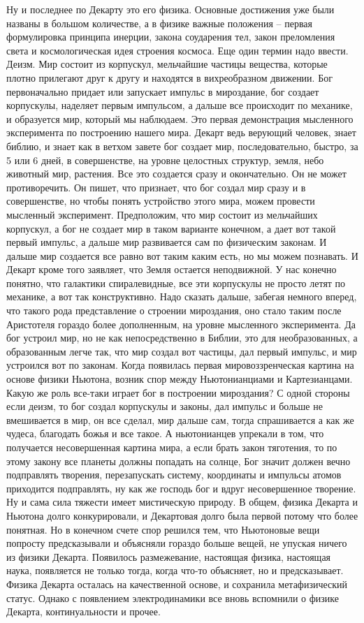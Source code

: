 \documentclass[a4paper, 12pt]{article}
\begin{document}
Ну и последнее по Декарту это его физика. Основные достижения уже были 
названы в большом количестве, а в физике важные положения -- первая 
формулировка принципа инерции, закона соударения тел, закон преломления 
света и космологическая идея строения космоса. Еще один термин надо 
ввести. Деизм. Мир состоит из корпускул, мельчайшие частицы вещества, 
которые плотно прилегают друг к другу и находятся в вихреобразном 
движении. Бог первоначально придает или запускает импульс в мироздание, 
бог создает корпускулы, наделяет первым импульсом, а дальше все 
происходит по механике, и образуется мир, который мы наблюдаем. Это 
первая демонстрация мысленного эксперимента по построению нашего мира. 
Декарт ведь верующий человек, знает библию, и знает как в ветхом завете 
бог создает мир, последовательно, быстро, за 5 или 6 дней, 
в совершенстве, на уровне целостных структур, земля, небо животный мир, 
растения. Все это создается сразу и окончательно. Он не может 
противоречить. Он пишет, что признает, что бог создал мир сразу 
и в совершенстве, но чтобы понять устройство этого мира, можем провести 
мысленный эксперимент. Предположим, что мир состоит из мельчайших 
корпускул, а бог не создает мир в таком варианте конечном, а дает вот 
такой первый импульс, а дальше мир развивается сам по физическим 
законам. И дальше мир создается все равно вот таким каким есть, но мы 
можем познавать. И Декарт кроме того заявляет, что Земля остается 
неподвижной. У нас конечно понятно, что галактики спиралевидные, все эти 
корпускулы не просто летят по механике, а вот так конструктивно. Надо 
сказать дальше, забегая немного вперед, что такого рода представление 
о строении мироздания, оно стало таким после Аристотеля гораздо более 
дополненным, на уровне мысленного эксперимента. Да бог устроил мир, но 
не как непосредственно в Библии, это для необразованных, а образованным 
легче так, что мир создал вот частицы, дал первый импульс, и мир 
устроился вот по законам. Когда появилась первая мировоззренческая 
картина на основе физики Ньютона, возник спор между Ньютонианциами 
и Картезианцами. Какую же роль все-таки играет бог в построении 
мироздания? С одной стороны если деизм, то бог создал корпускулы 
и законы, дал импульс и больше не вмешивается в мир, он все сделал, мир 
дальше сам, тогда спрашивается а как же чудеса, благодать божья и все 
такое. А ньютонианцев упрекали в том, что получается несовершенная 
картина мира, а если брать закон тяготения, то по этому закону все 
планеты должны попадать на солнце, Бог значит должен вечно подправлять 
творения, перезапускать систему, координаты и импульсы атомов приходится 
подправлять, ну как же господь бог и вдруг несовершенное творение. Ну 
и сама сила тяжести имеет мистическую природу. В общем, физика Декарта 
и Ньютона долго конкурировали, и Декартовая долго была первой потому что 
более понятная. Но в конечном счете спор решился тем, что Ньютоновые 
вещи попросту предсказывали и объясняли гораздо больше вещей, не упуская 
ничего из физики Декарта. Появилось размежевание, настоящая физика, 
настоящая наука, появляется не только тогда, когда что-то объясняет, но 
и предсказывает. Физика Декарта осталась на качественной основе, 
и сохранила метафизический статус. Однако с появлением электродинамики 
все вновь вспомнили о физике Декарта, континуальности и прочее.
\end{document}
